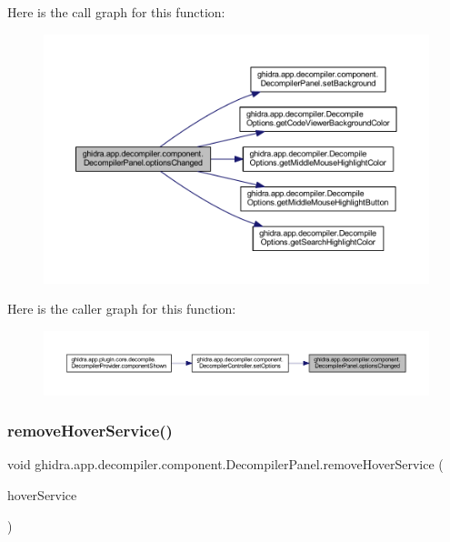 Here is the call graph for this function\+:
\nopagebreak
\begin{figure}[H]
\begin{center}
\leavevmode
\includegraphics[width=350pt]{classghidra_1_1app_1_1decompiler_1_1component_1_1_decompiler_panel_ad34eb82dfc3a0760d3ed82097d0fb1df_cgraph}
\end{center}
\end{figure}
Here is the caller graph for this function\+:
\nopagebreak
\begin{figure}[H]
\begin{center}
\leavevmode
\includegraphics[width=350pt]{classghidra_1_1app_1_1decompiler_1_1component_1_1_decompiler_panel_ad34eb82dfc3a0760d3ed82097d0fb1df_icgraph}
\end{center}
\end{figure}
\mbox{\label{classghidra_1_1app_1_1decompiler_1_1component_1_1_decompiler_panel_aabb5b076308bdfe1c2a8070a20eb63a6}} 
\subsubsection{\texorpdfstring{removeHoverService()}{removeHoverService()}}
{\footnotesize\ttfamily void ghidra.\+app.\+decompiler.\+component.\+Decompiler\+Panel.\+remove\+Hover\+Service (\begin{DoxyParamCaption}\item[{\mbox{\hyperlink{interfaceghidra_1_1app_1_1decompiler_1_1component_1_1hover_1_1_decompiler_hover_service}{Decompiler\+Hover\+Service}}}]{hover\+Service }\end{DoxyParamCaption})\hspace{0.3cm}{\ttfamily [inline]}}



